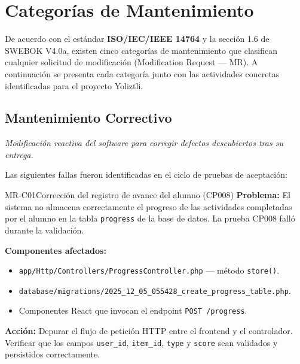 
\chapter{Categorías de Mantenimiento}

De acuerdo con el estándar \textbf{ISO/IEC/IEEE 14764} y la sección 1.6 de SWEBOK V4.0a,
existen cinco categorías de mantenimiento que clasifican cualquier solicitud de modificación
(Modification Request --- MR). A continuación se presenta cada categoría junto con las
actividades concretas identificadas para el proyecto Yoliztli.

\section{Mantenimiento Correctivo}

\textit{Modificación reactiva del software para corregir defectos descubiertos tras su entrega.}

\medskip
Las siguientes fallas fueron identificadas en el ciclo de pruebas de aceptación:

\begin{RequisitoFuncional}{MR-C01}{Corrección del registro de avance del alumno (CP008)}
    \textbf{Problema:} El sistema no almacena correctamente el progreso de las
    actividades completadas por el alumno en la tabla \texttt{progress} de la base de
    datos. La prueba CP008 falló durante la validación.

    \textbf{Componentes afectados:}
    \begin{itemize}
        \item \texttt{app/Http/Controllers/ProgressController.php} --- método \texttt{store()}.
        \item \texttt{database/migrations/2025\_12\_05\_055428\_create\_progress\_table.php}.
        \item Componentes React que invocan el endpoint \texttt{POST /progress}.
    \end{itemize}

    \textbf{Acción:} Depurar el flujo de petición HTTP entre el frontend y el
    controlador. Verificar que los campos \texttt{user\_id}, \texttt{item\_id},
    \texttt{type} y \texttt{score} sean validados y persistidos correctamente.
\end{RequisitoFuncional}


